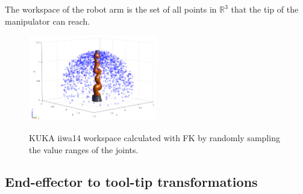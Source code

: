 The workspace of the robot arm is the set of all points in $\mathbb{R}^3$ that the tip of the manipulator can reach.
\begin{figure}[htbp]
\centering
\includegraphics[width=0.5\textwidth]{images/workspace_sampling_1e3.png}\\
\caption{KUKA iiwa14 workspace calculated with FK by randomly sampling the value ranges of the joints.}
\end{figure}

\subsection{End-effector to tool-tip transformations}
\label{section:eef-tool-tip-transformations}


